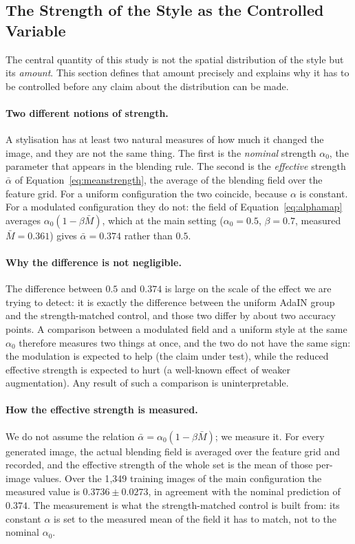 \subsection{The Strength of the Style as the Controlled Variable}
\label{sec:strength_energy}

The central quantity of this study is not the spatial distribution of the
style but its \emph{amount}. This section defines that amount precisely and
explains why it has to be controlled before any claim about the
distribution can be made.

\paragraph{Two different notions of strength.}
A stylisation has at least two natural measures of how much it changed the
image, and they are not the same thing. The first is the \emph{nominal}
strength $\alpha_0$, the parameter that appears in the blending rule. The
second is the \emph{effective} strength $\bar{\alpha}$ of
Equation~\eqref{eq:meanstrength}, the average of the blending field over
the feature grid. For a uniform configuration the two coincide, because
$\alpha$ is constant. For a modulated configuration they do not: the field
of Equation~\eqref{eq:alphamap} averages
$\alpha_0(1-\beta\bar{M})$, which at the main setting
($\alpha_0 = 0.5$, $\beta = 0.7$, measured $\bar{M} = 0.361$) gives
$\bar{\alpha} = 0.374$ rather than $0.5$.

\paragraph{Why the difference is not negligible.}
The difference between $0.5$ and $0.374$ is large on the scale of the
effect we are trying to detect: it is exactly the difference between the
uniform AdaIN group and the strength-matched control, and those two differ
by about two accuracy points. A comparison between a modulated field and a
uniform style at the same $\alpha_0$ therefore measures two things at once,
and the two do not have the same sign: the modulation is expected to help
(the claim under test), while the reduced effective strength is expected to
hurt (a well-known effect of weaker augmentation). Any result of such a
comparison is uninterpretable.

\paragraph{How the effective strength is measured.}
We do not assume the relation $\bar{\alpha} = \alpha_0(1-\beta\bar{M})$;
we measure it. For every generated image, the actual blending field is
averaged over the feature grid and recorded, and the effective strength of
the whole set is the mean of those per-image values. Over the 1{,}349
training images of the main configuration the measured value is
$0.3736 \pm 0.0273$, in agreement with the nominal prediction of $0.374$.
The measurement is what the strength-matched control is built from: its
constant $\alpha$ is set to the measured mean of the field it has to match,
not to the nominal $\alpha_0$.

